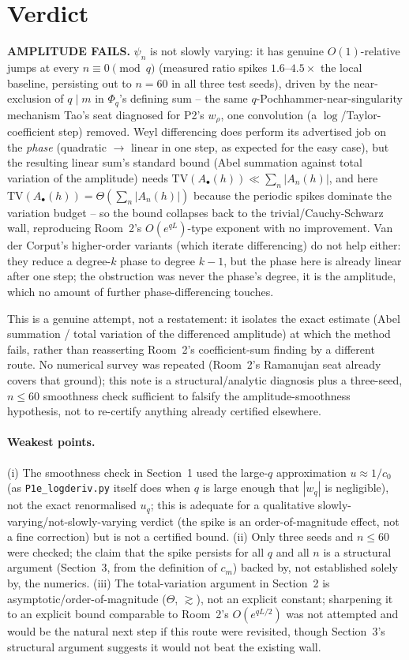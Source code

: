 \documentclass[11pt]{article}
\begin{document}
\section{Verdict}
\textbf{AMPLITUDE FAILS.} $\psi_n$ is not slowly varying: it has genuine $O(1)$-relative jumps at
every $n\equiv0\pmod q$ (measured ratio spikes $1.6$--$4.5\times$ the local baseline, persisting
out to $n=60$ in all three test seeds), driven by the near-exclusion of $q\mid m$ in $\Phi_q$'s
defining sum -- the same $q$-Pochhammer-near-singularity mechanism Tao's seat diagnosed for P2's
$w_\rho$, one convolution (a $\log$/Taylor-coefficient step) removed. Weyl differencing does perform
its advertised job on the \emph{phase} (quadratic $\to$ linear in one step, as expected for the
easy case), but the resulting linear sum's standard bound (Abel summation against total variation
of the amplitude) needs $\mathrm{TV}(A_\bullet(h))\ll\sum_n|A_n(h)|$, and here
$\mathrm{TV}(A_\bullet(h))=\Theta(\sum_n|A_n(h)|)$ because the periodic spikes dominate the
variation budget -- so the bound collapses back to the trivial/Cauchy-Schwarz wall, reproducing
Room~2's $O(e^{qL})$-type exponent with no improvement. Van der Corput's higher-order variants
(which iterate differencing) do not help either: they reduce a degree-$k$ phase to degree $k-1$,
but the phase here is already linear after one step; the obstruction was never the phase's degree,
it is the amplitude, which no amount of further phase-differencing touches.

This is a genuine attempt, not a restatement: it isolates the exact estimate (Abel summation /
total variation of the differenced amplitude) at which the method fails, rather than reasserting
Room~2's coefficient-sum finding by a different route. No numerical survey was repeated (Room~2's
Ramanujan seat already covers that ground); this note is a structural/analytic diagnosis plus a
three-seed, $n\le60$ smoothness check sufficient to falsify the amplitude-smoothness hypothesis,
not to re-certify anything already certified elsewhere.

\paragraph{Weakest points.} (i) The smoothness check in Section~1 used the large-$q$ approximation
$u\approx1/c_0$ (as \texttt{P1e\_logderiv.py} itself does when $q$ is large enough that $|w_q|$ is
negligible), not the exact renormalised $u_q$; this is adequate for a qualitative
slowly-varying/not-slowly-varying verdict (the spike is an order-of-magnitude effect, not a fine
correction) but is not a certified bound. (ii) Only three seeds and $n\le60$ were checked; the claim
that the spike persists for all $q$ and all $n$ is a structural argument (Section~3, from the
definition of $c_m$) backed by, not established solely by, the numerics. (iii) The total-variation
argument in Section~2 is asymptotic/order-of-magnitude ($\Theta$, $\gtrsim$), not an explicit
constant; sharpening it to an explicit bound comparable to Room~2's $O(e^{qL/2})$ was not attempted
and would be the natural next step if this route were revisited, though Section~3's structural
argument suggests it would not beat the existing wall.
\end{document}
